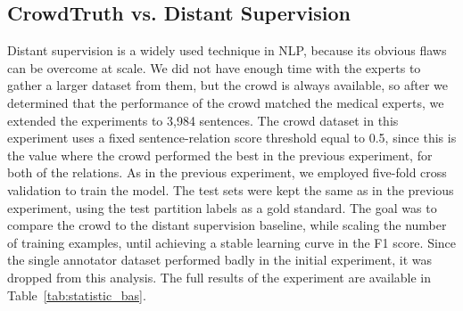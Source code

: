 \subsection{CrowdTruth vs. Distant Supervision}
\label{sec:res_ds}

Distant supervision is a widely used technique in NLP, because its obvious flaws can be overcome at scale.  We did not have enough time with the experts to gather a larger dataset from them, but the crowd is always available, so after we determined that the performance of the crowd matched the medical experts, we extended the experiments to 3,984 sentences. The crowd dataset in this experiment uses a fixed sentence-relation score threshold equal to 0.5, since this is the value where the crowd performed the best in the previous experiment, for both of the relations. As in the previous experiment, we employed five-fold cross validation to train the model. The test sets were kept the same as in the previous experiment, using the test partition labels as a gold standard. The goal was to compare the crowd to the distant supervision baseline, while scaling the number of training examples, until achieving a stable learning curve in the F1 score. Since the single annotator dataset performed badly in the initial experiment, it was dropped from this analysis. The full results of the experiment are available in Table~\ref{tab:statistic_bas}.


